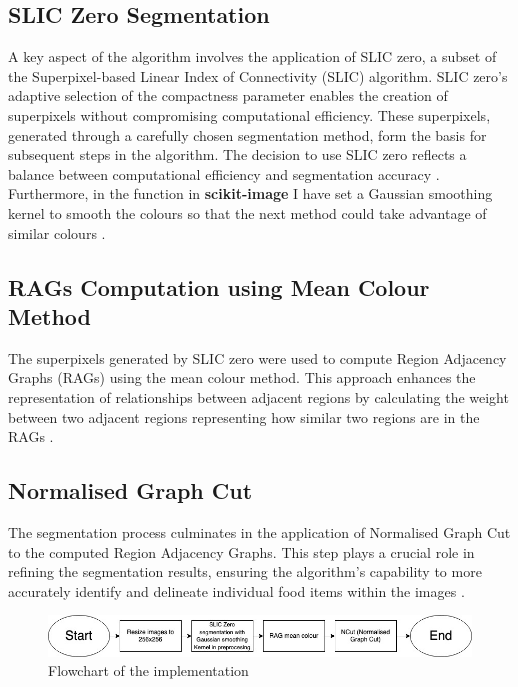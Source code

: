 \documentclass[conference]{IEEEtran}
\begin{document}
 	\subsection{SLIC Zero Segmentation}
 	
 	A key aspect of the algorithm involves the application of SLIC zero, a subset of the Superpixel-based Linear Index of Connectivity (SLIC) algorithm. SLIC zero's adaptive selection of the compactness parameter enables the creation of superpixels without compromising computational efficiency. These superpixels, generated through a carefully chosen segmentation method, form the basis for subsequent steps in the algorithm. The decision to use SLIC zero reflects a balance between computational efficiency and segmentation accuracy \cite{6205760}. Furthermore, in the function in  \textbf{scikit-image} I have set a Gaussian smoothing kernel to smooth the colours so that the next method could take advantage of similar colours \cite{scikit-image}.
 	
 	\subsection{RAGs Computation using Mean Colour Method}
 	The superpixels generated by SLIC zero were used to compute Region Adjacency Graphs (RAGs) using the mean colour method. This approach enhances the representation of relationships between adjacent regions by calculating the weight between two adjacent regions representing how similar two regions are in the RAGs \cite{841950}.
 	
 	\subsection{Normalised Graph Cut}
 	
 	The segmentation process culminates in the application of Normalised Graph Cut to the computed Region Adjacency Graphs. This step plays a crucial role in refining the segmentation results, ensuring the algorithm's capability to more accurately identify and delineate individual food items within the images \cite{841950}.
 	
 	\begin{figure}[htbp]
 		\centering
 		\includegraphics[width = \textwidth]{final_flowchart.jpg}
 		\caption{Flowchart of the implementation}
 		\label{fig:flowchart}
 	\end{figure}
 	
\end{document}
